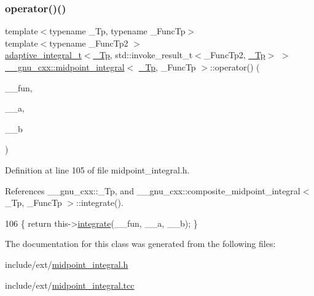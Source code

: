 \subsubsection{\texorpdfstring{operator()()}{operator()()}\hspace{0.1cm}{\footnotesize\ttfamily [2/2]}}
{\footnotesize\ttfamily template$<$typename \+\_\+\+Tp, typename \+\_\+\+Func\+Tp$>$ \\
template$<$typename \+\_\+\+Func\+Tp2 $>$ \\
\hyperlink{struct____gnu__cxx_1_1adaptive__integral__t}{adaptive\+\_\+integral\+\_\+t}$<$\hyperlink{namespace____gnu__cxx_a3b19a9c800ca194374ef9172290f7d79}{\+\_\+\+Tp}, std\+::invoke\+\_\+result\+\_\+t$<$\+\_\+\+Func\+Tp2, \hyperlink{namespace____gnu__cxx_a3b19a9c800ca194374ef9172290f7d79}{\+\_\+\+Tp}$>$ $>$ \hyperlink{class____gnu__cxx_1_1midpoint__integral}{\+\_\+\+\_\+gnu\+\_\+cxx\+::midpoint\+\_\+integral}$<$ \hyperlink{namespace____gnu__cxx_a3b19a9c800ca194374ef9172290f7d79}{\+\_\+\+Tp}, \+\_\+\+Func\+Tp $>$\+::operator() (\begin{DoxyParamCaption}\item[{\+\_\+\+Func\+Tp2}]{\+\_\+\+\_\+fun,  }\item[{\hyperlink{namespace____gnu__cxx_a3b19a9c800ca194374ef9172290f7d79}{\+\_\+\+Tp}}]{\+\_\+\+\_\+a,  }\item[{\hyperlink{namespace____gnu__cxx_a3b19a9c800ca194374ef9172290f7d79}{\+\_\+\+Tp}}]{\+\_\+\+\_\+b }\end{DoxyParamCaption})\hspace{0.3cm}{\ttfamily [inline]}}



Definition at line 105 of file midpoint\+\_\+integral.\+h.



References \+\_\+\+\_\+gnu\+\_\+cxx\+::\+\_\+\+Tp, and \+\_\+\+\_\+gnu\+\_\+cxx\+::composite\+\_\+midpoint\+\_\+integral$<$ \+\_\+\+Tp, \+\_\+\+Func\+Tp $>$\+::integrate().


\begin{DoxyCode}
106         \{ \textcolor{keywordflow}{return} this->\hyperlink{class____gnu__cxx_1_1midpoint__integral_ae991ad240c41205cbe4e68ef59bc6ca8}{integrate}(\_\_fun, \_\_a, \_\_b); \}
\end{DoxyCode}


The documentation for this class was generated from the following files\+:\begin{DoxyCompactItemize}
\item 
include/ext/\hyperlink{midpoint__integral_8h}{midpoint\+\_\+integral.\+h}\item 
include/ext/\hyperlink{midpoint__integral_8tcc}{midpoint\+\_\+integral.\+tcc}\end{DoxyCompactItemize}
